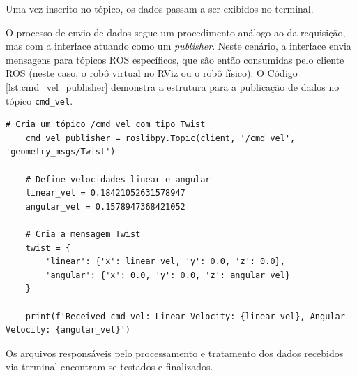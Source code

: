 Uma vez inscrito no tópico, os dados passam a ser exibidos no terminal.

O processo de envio de dados segue um procedimento análogo ao da requisição, mas com a interface atuando como um \textit{publisher}. Neste cenário, a interface envia mensagens para tópicos ROS específicos, que são então consumidas pelo cliente ROS (neste caso, o robô virtual no RViz ou o robô físico). O Código \ref{lst:cmd_vel_publisher} demonstra a estrutura para a publicação de dados no tópico \texttt{cmd\_vel}.

\begin{lstlisting}[caption={Código para publicação de dados em tópico ROS},label={lst:cmd_vel_publisher}]
    # Cria um tópico /cmd_vel com tipo Twist
    cmd_vel_publisher = roslibpy.Topic(client, '/cmd_vel', 'geometry_msgs/Twist')

    # Define velocidades linear e angular
    linear_vel = 0.18421052631578947
    angular_vel = 0.1578947368421052

    # Cria a mensagem Twist
    twist = {
        'linear': {'x': linear_vel, 'y': 0.0, 'z': 0.0},
        'angular': {'x': 0.0, 'y': 0.0, 'z': angular_vel}
    }

    print(f'Received cmd_vel: Linear Velocity: {linear_vel}, Angular Velocity: {angular_vel}')
\end{lstlisting}

Os arquivos responsáveis pelo processamento e tratamento dos dados recebidos via terminal encontram-se testados e finalizados.